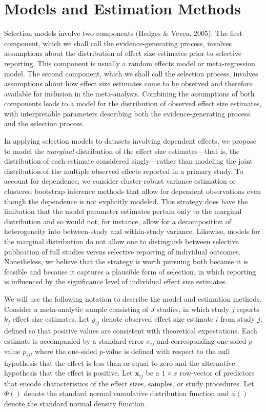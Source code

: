 \documentclass[
  american,
  man, donotrepeattitle,floatsintext]{apa7}
\begin{document}
\section{Models and Estimation Methods}\label{model-and-estimation}

Selection models involve two components (Hedges \& Vevea, 2005).
The first component, which we shall call the evidence-generating process, involves assumptions about the distribution of effect size estimates prior to selective reporting.
This component is usually a random effects model or meta-regression model.
The second component, which we shall call the selection process, involves assumptions about how effect size estimates come to be observed and therefore available for inclusion in the meta-analysis.
Combining the assumptions of both components leads to a model for the distribution of observed effect size estimates, with interpretable parameters describing both the evidence-generating process and the selection process.

In applying selection models to datasets involving dependent effects, we propose to model the \emph{marginal} distribution of the effect size estimates---that is, the distribution of each estimate considered singly---rather than modeling the joint distribution of the multiple observed effects reported in a primary study.
To account for dependence, we consider cluster-robust variance estimation or clustered bootstrap inference methods that allow for dependent observations even though the dependence is not explicitly modeled.
This strategy does have the limitation that the model parameter estimates pertain only to the marginal distribution and so would not, for instance, allow for a decomposition of heterogeneity into between-study and within-study variance.
Likewise, models for the marginal distribution do not allow one to distinguish between selective publication of full studies versus selective reporting of individual outcomes.
Nonetheless, we believe that the strategy is worth pursuing both because it is feasible and because it captures a plausible form of selection, in which reporting is influenced by the significance level of individual effect size estimates.

We will use the following notation to describe the model and estimation methods. Consider a meta-analytic sample consisting of \(J\) studies, in which study \(j\) reports \(k_j\) effect size estimates. Let \(y_{ij}\) denote observed effect size estimate \(i\) from study \(j\), defined so that positive values are consistent with theoretical expectations. Each estimate is accompanied by a standard error \(\sigma_{ij}\) and corresponding one-sided \(p\)-value \(p_{ij}\), where the one-sided \(p\)-value is defined with respect to the null hypothesis that the effect is less than or equal to zero and the alternative hypothesis that the effect is positive. Let \(\mathbf{x}_{ij}\) be a \(1 \times x\) row-vector of predictors that encode characteristics of the effect sizes, samples, or study procedures. Let \(\Phi()\) denote the standard normal cumulative distribution function and \(\phi()\) denote the standard normal density function.
\end{document}
